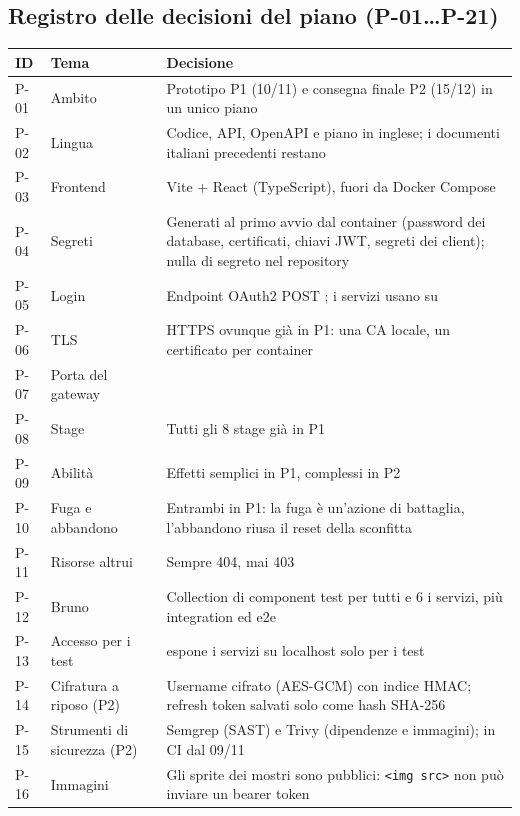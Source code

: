 \documentclass[11pt,a4paper]{article}
\begin{document}
\subsection{Registro delle decisioni del piano (P-01…P-21)}

\begin{xltabular}{\linewidth}{@{}L{0.9cm}L{3.6cm}Y@{}}
  \toprule
  ID & Tema & Decisione \\
  \midrule
  \endhead
  P-01 & Ambito & Prototipo P1 (10/11) e consegna finale P2 (15/12) in un unico piano \\
  P-02 & Lingua & Codice, API, OpenAPI e piano in inglese; i documenti italiani precedenti restano \\
  P-03 & Frontend & Vite + React (TypeScript), fuori da Docker Compose \\
  P-04 & Segreti & Generati al primo avvio dal container  (password dei database, certificati, chiavi JWT, segreti dei client); nulla di segreto nel repository \\
  P-05 & Login & Endpoint OAuth2 POST ; i servizi usano  su  \\
  P-06 & TLS & HTTPS ovunque già in P1: una CA locale, un certificato per container \\
  P-07 & Porta del gateway &  \\
  P-08 & Stage & Tutti gli 8 stage già in P1 \\
  P-09 & Abilità & Effetti semplici in P1, complessi in P2 \\
  P-10 & Fuga e abbandono & Entrambi in P1: la fuga è un'azione di battaglia, l'abbandono riusa il reset della sconfitta \\
  P-11 & Risorse altrui & Sempre 404, mai 403 \\
  P-12 & Bruno & Collection di component test per tutti e 6 i servizi, più integration ed e2e \\
  P-13 & Accesso per i test &  espone i servizi su localhost solo per i test \\
  P-14 & Cifratura a riposo (P2) & Username cifrato (AES-GCM) con indice HMAC; refresh token salvati solo come hash SHA-256 \\
  P-15 & Strumenti di sicurezza (P2) & Semgrep (SAST) e Trivy (dipendenze e immagini); in CI dal 09/11 \\
  P-16 & Immagini & Gli sprite dei mostri sono pubblici: \texttt{<img src>} non può inviare un bearer token \\

\end{xltabular}
\end{document}

